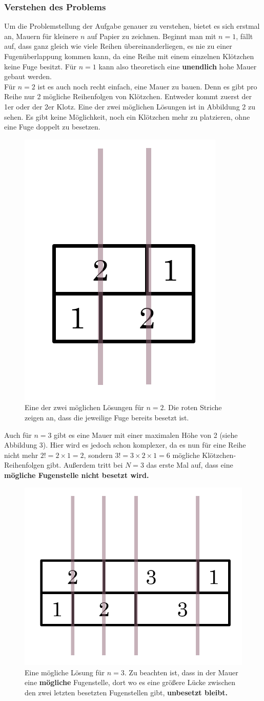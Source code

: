 \documentclass[a4paper,12pt]{article}
\begin{document}
\subsubsection{Verstehen des Problems}
Um die Problemstellung der Aufgabe genauer zu verstehen, bietet es sich erstmal an, Mauern für kleinere $n$ auf Papier zu zeichnen.
Beginnt man mit $n = 1$, fällt auf, dass ganz gleich wie viele Reihen übereinanderliegen, es nie zu einer Fugenüberlappung kommen kann, da eine Reihe mit einem einzelnen Klötzchen keine Fuge besitzt.
Für $n = 1$ kann also theoretisch eine \textbf{unendlich} hohe Mauer gebaut werden.
\\[0.4cm]
Für $n = 2$ ist es auch noch recht einfach, eine Mauer zu bauen. Denn es gibt pro Reihe nur 2 mögliche Reihenfolgen von Klötzchen. Entweder kommt zuerst der 1er oder der 2er Klotz. 
Eine der zwei möglichen Lösungen ist in Abbildung 2 zu sehen. Es gibt keine Möglichkeit, noch ein Klötzchen mehr zu platzieren, ohne eine Fuge doppelt zu besetzen.
\begin{figure}[H]
    \centering
    \includegraphics[width=0.3\linewidth]{Bilder/Aufgabe1/Loesung_N2.png}
    \caption{Eine der zwei möglichen Lösungen für $n = 2$. Die roten Striche zeigen an, dass die jeweilige Fuge bereits besetzt ist.}
\end{figure}

Auch für $n = 3$ gibt es eine Mauer mit einer maximalen Höhe von 2 (siehe Abbildung 3). Hier wird es jedoch schon komplexer, da es nun für eine Reihe nicht mehr $2! = 2\times1 = 2$, sondern $3! = 3\times2\times1 = 6$ mögliche Klötzchen-Reihenfolgen gibt.
Außerdem tritt bei $N = 3$ das erste Mal auf, dass eine \textbf{mögliche Fugenstelle nicht besetzt wird.}
\begin{figure}[H]
    \centering
    \includegraphics[width=0.5\linewidth]{Bilder/Aufgabe1/Loesung_N3.png}
    \caption{Eine mögliche Lösung für $n = 3$. Zu beachten ist, dass in der Mauer eine \textbf{mögliche} Fugenstelle, dort wo es eine größere Lücke zwischen den zwei letzten besetzten Fugenstellen gibt, \textbf{unbesetzt bleibt.}}
\end{figure}
\end{document}
